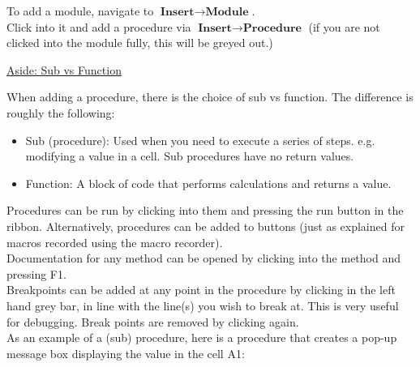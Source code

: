 \documentclass[8pt]{extarticle}
\begin{document}
\begin{multicols}{3}
To add a module, navigate to $\textbf{Insert} \rightarrow \textbf{Module}$. \\

Click into it and add a procedure via $\textbf{Insert} \rightarrow \textbf{Procedure}$ (if you are not clicked into the module fully, this will be greyed out.)

\begin{tcolorbox}[colback=gray!10, colframe=gray!50]
    \begin{center}
        \underline{Aside: Sub vs Function}
    \end{center}
    When adding a procedure, there is the choice of sub vs function. The difference is roughly the following:
    \begin{itemize}
        \item Sub (procedure): Used when you need to execute a series of steps. e.g. modifying a value in a cell. Sub procedures have no return values.
        \item Function: A block of code that performs calculations and returns a value.
    \end{itemize}
\end{tcolorbox}

Procedures can be run by clicking into them and pressing the run button in the ribbon. Alternatively, procedures can be added to buttons (just as explained for macros recorded using the macro recorder).\\

Documentation for any method can be opened by clicking into the method and pressing F1.\\

Breakpoints can be added at any point in the procedure by clicking in the left hand grey bar, in line with the line(s) you wish to break at. This is very useful for debugging. Break points are removed by clicking again.\\

As an example of a (sub) procedure, here is a procedure that creates a pop-up message box displaying the value in the cell A1:


\end{multicols}
\end{document}
